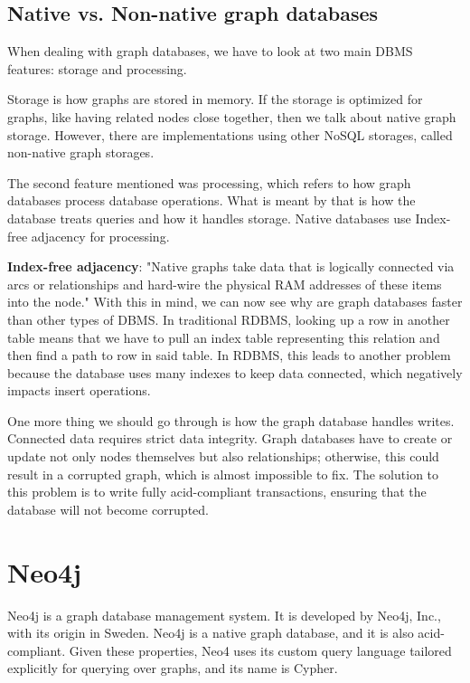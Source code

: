 \subsection {Native vs. Non-native graph databases}

When dealing with graph databases, we have to look at two main DBMS features: storage and processing.

Storage is how graphs are stored in memory. If the storage is optimized for graphs, like having related nodes close together, then we talk about native graph storage. However, there are implementations using other NoSQL storages, called non-native graph storages.

The second feature mentioned was processing, which refers to how graph databases process database operations. What is meant by that is how the database treats queries and how it handles storage. Native databases use Index-free adjacency for processing.
\cite{chao_graph_2018}

\textbf{Index-free adjacency}: "Native graphs take data that is logically connected via arcs or relationships and hard-wire the physical RAM addresses of these items into the node."
\cite{mccreary_neighborhood_2021} With this in mind, we can now see why are graph databases faster than other types of DBMS.
In traditional RDBMS, looking up a row in another table means that we have to pull an index table representing this relation and then find a path to row in said table.
In RDBMS, this leads to another problem because the database uses many indexes to keep data connected, which negatively impacts insert operations.

One more thing we should go through is how the graph database handles writes. Connected data requires strict data integrity.
Graph databases have to create or update not only nodes themselves but also relationships; otherwise, this could result in a corrupted graph, which is almost impossible to fix.
The solution to this problem is to write fully \acrshort{acid}-compliant transactions, ensuring that the database will not become corrupted.
\cite{chao_graph_2018}

\section{Neo4j}

Neo4j is a graph database management system. It is developed by Neo4j, Inc., with its origin in Sweden. \cite{noauthor_company_nodate}
Neo4j is a native graph database, and it is also \acrshort{acid}-compliant. Given these properties, Neo4 uses its custom query language tailored explicitly for querying over graphs,
and its name is Cypher. \cite{noauthor_neo4j_nodate-2}

